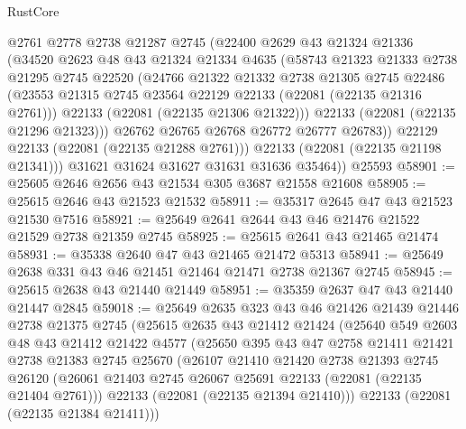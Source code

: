 \begin{lexlean}{RustCore}
\begin{coremodule}
            @2761
            @2778
            @2738
            @21287
            @2745
            (@22400
              @2629
              @43
              @21324
              @21336
              (@34520
                @2623
                @48
                @43
                @21324
                @21334
                @4635
                (@58743
                  @21323
                  @21333
                  @2738
                  @21295
                  @2745
                  @22520
                  (@24766
                    @21322
                    @21332
                    @2738
                    @21305
                    @2745
                    @22486
                    (@23553 @21315 @2745 @23564 @22129 @22133 (@22081 (@22135 @21316 @2761)))
                    @22133
                    (@22081 (@22135 @21306 @21322)))
                  @22133
                  (@22081 (@22135 @21296 @21323)))
                @26762
                @26765
                @26768
                @26772
                @26777
                @26783))
            @22129
            @22133
            (@22081 (@22135 @21288 @2761)))
          @22133
          (@22081 (@22135 @21198 @21341)))
        @31621
        @31624
        @31627
        @31631
        @31636
        @35464))
    @25593
@58901 := @25605 @2646 @2656 @43 @21534 @305 @3687 @21558 @21608
@58905 := @25615 @2646 @43 @21523 @21532
@58911 := @35317 @2645 @47 @43 @21523 @21530 @7516
@58921 := @25649 @2641 @2644 @43 @46 @21476 @21522 @21529 @2738 @21359 @2745
@58925 := @25615 @2641 @43 @21465 @21474
@58931 := @35338 @2640 @47 @43 @21465 @21472 @5313
@58941 := @25649 @2638 @331 @43 @46 @21451 @21464 @21471 @2738 @21367 @2745
@58945 := @25615 @2638 @43 @21440 @21449
@58951 := @35359 @2637 @47 @43 @21440 @21447 @2845
@59018 := @25649
    @2635
    @323
    @43
    @46
    @21426
    @21439
    @21446
    @2738
    @21375
    @2745
    (@25615
      @2635
      @43
      @21412
      @21424
      (@25640
        @549
        @2603
        @48
        @43
        @21412
        @21422
        @4577
        (@25650
          @395
          @43
          @47
          @2758
          @21411
          @21421
          @2738
          @21383
          @2745
          @25670
          (@26107
            @21410
            @21420
            @2738
            @21393
            @2745
            @26120
            (@26061 @21403 @2745 @26067 @25691 @22133 (@22081 (@22135 @21404 @2761)))
            @22133
            (@22081 (@22135 @21394 @21410)))
          @22133
          (@22081 (@22135 @21384 @21411)))

\end{coremodule}
\end{lexlean}
